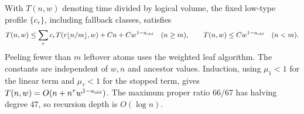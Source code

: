 With $T(n,w)$ denoting time divided by logical volume, the fixed low-type
profile $\{c_r\}$, including fallback classes, satisfies
\[
 T(n,w)\le\sum_rc_rT(r\lfloor n/m\rfloor,w)+Cn+Cw^{1-a_{\rm old}}
 \quad(n\ge m),\qquad
 T(n,w)\le Cw^{1-a_{\rm old}}\quad(n<m).
\]
Peeling fewer than $m$ leftover atoms uses the weighted leaf algorithm.
The constants are independent of $w,n$ and ancestor values. Induction,
using $\mu_1<1$ for the linear term and $\mu_\tau<1$ for the stopped term,
gives $T(n,w)=O(n+n^\tau w^{1-a_{\rm old}})$. The maximum proper ratio
$66/67$ has halving degree $47$, so recursion depth is $O(\log n)$.
